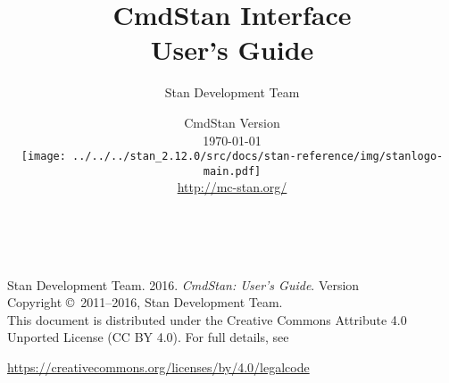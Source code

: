 \title{\Huge\bf CmdStan Interface \\[4pt] {\LARGE User's Guide}}
\author{Stan Development Team}

\date{\vspace*{36pt} CmdStan Version \cmdstanversion
\\[8pt] {\small \today}
\\[36pt]
{
\vfill
\texttt{[image: ../../../stan\_2.12.0/src/docs/stan-reference/img/stanlogo-main.pdf]}}
\\
\vspace*{6pt}
{\small \url{http://mc-stan.org/}}
}
\maketitle

\newpage
\thispagestyle{empty}
\mbox{ }
\vfill
\begin{center}
\begin{minipage}[t]{0.75\textwidth}
\small
Stan Development Team. 2016.
{\it CmdStan: User's Guide}. Version
\cmdstanversion
\vspace*{20pt}
\mbox{ }
\\
Copyright \copyright \ 2011--2016, Stan Development Team.
\vspace*{28pt}
\mbox{} \\
This document is distributed under the Creative Commons Attribute 4.0
Unported License (CC BY 4.0).  For full details, see
\begin{center}
\url{https://creativecommons.org/licenses/by/4.0/legalcode}
\end{center}
\end{minipage}
\vspace*{24pt}
\mbox{ }
\end{center}
